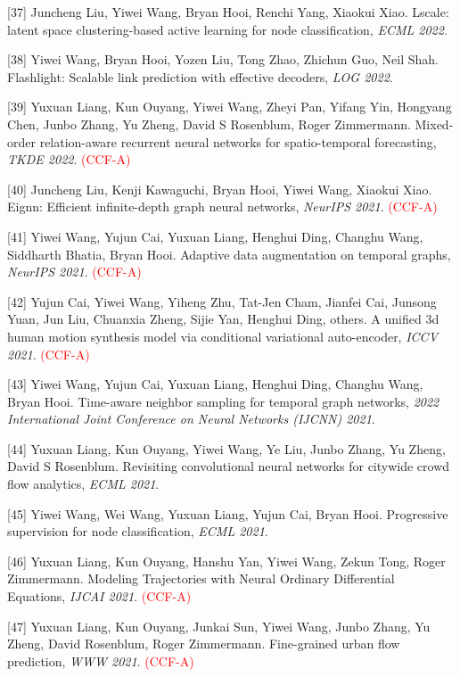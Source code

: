 [37] Juncheng Liu, Yiwei Wang, Bryan Hooi, Renchi Yang, Xiaokui Xiao. Lscale: latent space clustering-based active learning for node classification, \textit{ECML 2022}.

[38] Yiwei Wang, Bryan Hooi, Yozen Liu, Tong Zhao, Zhichun Guo, Neil Shah. Flashlight: Scalable link prediction with effective decoders, \textit{LOG 2022}.

[39] Yuxuan Liang, Kun Ouyang, Yiwei Wang, Zheyi Pan, Yifang Yin, Hongyang Chen, Junbo Zhang, Yu Zheng, David S Rosenblum, Roger Zimmermann. Mixed-order relation-aware recurrent neural networks for spatio-temporal forecasting, \textit{TKDE 2022}. \textcolor{red}{(CCF-A)}

[40] Juncheng Liu, Kenji Kawaguchi, Bryan Hooi, Yiwei Wang, Xiaokui Xiao. Eignn: Efficient infinite-depth graph neural networks, \textit{NeurIPS 2021}. \textcolor{red}{(CCF-A)}

[41] Yiwei Wang, Yujun Cai, Yuxuan Liang, Henghui Ding, Changhu Wang, Siddharth Bhatia, Bryan Hooi. Adaptive data augmentation on temporal graphs, \textit{NeurIPS 2021}. \textcolor{red}{(CCF-A)}

[42] Yujun Cai, Yiwei Wang, Yiheng Zhu, Tat-Jen Cham, Jianfei Cai, Junsong Yuan, Jun Liu, Chuanxia Zheng, Sijie Yan, Henghui Ding, others. A unified 3d human motion synthesis model via conditional variational auto-encoder, \textit{ICCV 2021}. \textcolor{red}{(CCF-A)}

[43] Yiwei Wang, Yujun Cai, Yuxuan Liang, Henghui Ding, Changhu Wang, Bryan Hooi. Time-aware neighbor sampling for temporal graph networks, \textit{2022 International Joint Conference on Neural Networks (IJCNN) 2021}.

[44] Yuxuan Liang, Kun Ouyang, Yiwei Wang, Ye Liu, Junbo Zhang, Yu Zheng, David S Rosenblum. Revisiting convolutional neural networks for citywide crowd flow analytics, \textit{ECML 2021}.

[45] Yiwei Wang, Wei Wang, Yuxuan Liang, Yujun Cai, Bryan Hooi. Progressive supervision for node classification, \textit{ECML 2021}.

[46] Yuxuan Liang, Kun Ouyang, Hanshu Yan, Yiwei Wang, Zekun Tong, Roger Zimmermann. Modeling Trajectories with Neural Ordinary Differential Equations, \textit{IJCAI 2021}. \textcolor{red}{(CCF-A)}

[47] Yuxuan Liang, Kun Ouyang, Junkai Sun, Yiwei Wang, Junbo Zhang, Yu Zheng, David Rosenblum, Roger Zimmermann. Fine-grained urban flow prediction, \textit{WWW 2021}. \textcolor{red}{(CCF-A)}

